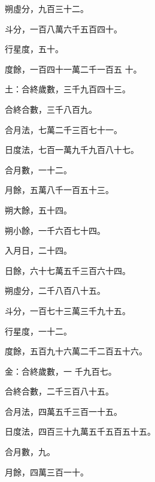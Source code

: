 \begin{pinyinscope}
 朔虛分，九百三十二。



 斗分，一百八萬六千五百四十。



 行星度，五十。



 度餘，一百四十一萬二千一百五
 十。



 土：合終歲數，三千九百四十三。



 合終合數，三千八百九。



 合月法，七萬二千三百七十一。



 日度法，七百一萬九千九百八十七。



 合月數，一十二。



 月餘，五萬八千一百五十三。



 朔大餘，五十四。



 朔小餘，一千六百七十四。



 入月日，二十四。



 日餘，六十七萬五千三百六十四。



 朔虛分，二千八百八十五。



 斗分，一百七十三萬三千九十五。



 行星度，一十二。



 度餘，五百九十六萬二千二百五十六。



 金：合終歲數，一
 千九百七。



 合終合數，二千三百八十五。



 合月法，四萬五千三百一十五。



 日度法，四百三十九萬五千五百五十五。



 合月數，九。



 月餘，四萬三百一十。




\end{pinyinscope}

